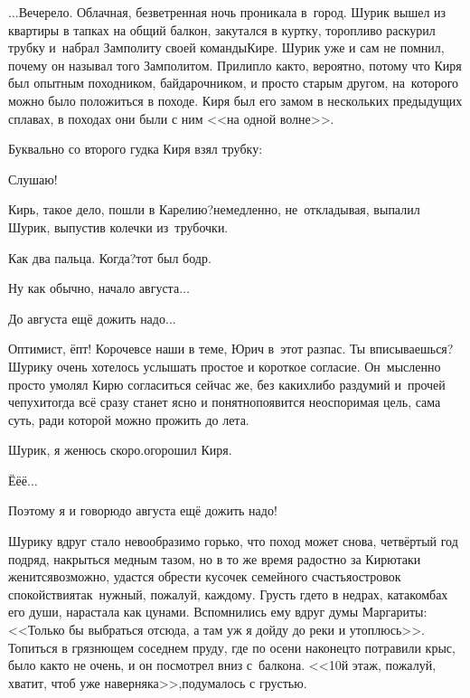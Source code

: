 {%
	
	$\ldots$Вечерело. Облачная, безветренная ночь проникала в~город.  Шурик вышел из квартиры в тапках на общий балкон, закутался в куртку, торопливо раскурил трубку и~набрал Замполиту своей команды\mdash Кире. Шурик уже и сам не помнил, почему он называл того Замполитом. Прилипло как\sdash то, вероятно, потому что Киря был опытным походником, байдарочником, и просто старым другом, на~которого можно было положиться в походе. Киря был его замом в нескольких предыдущих сплавах, в походах они были с ним <<на одной волне>>.

	Буквально со второго гудка Киря взял трубку:
	
	\diagdash Слушаю!
	
	\diagdash Кирь, такое дело, пошли в Карелию?\mdash немедленно, не~откладывая, выпалил Шурик, выпустив колечки из~трубочки.
	
	\diagdash Как два пальца. Когда?\mdash тот был бодр.
	
	\diagdash Ну как обычно, начало августа$\ldots$
	
	\diagdash До августа ещё дожить надо$\ldots$
	
	\diagdash Оптимист, ёпт! Короче\mdash все наши в теме, Юрич в~этот раз\mdash пас. Ты вписываешься?\mdash Шурику очень хотелось услышать простое и короткое согласие. Он~мысленно просто умолял Кирю согласиться сейчас же, без каких\sdash либо раздумий и~прочей чепухи\mdash тогда всё сразу станет ясно и понятно\mdash появится неоспоримая цель, сама суть, ради которой можно прожить до лета.
	
	\diagdash Шурик, я женюсь скоро.\mdash огорошил Киря.
	
	\diagdash Ё\sdash ё\sdash ё$\ldots$
	
	\diagdash Поэтому я и говорю\mdash до августа ещё дожить надо!
	
	Шурику вдруг стало невообразимо горько, что поход может снова, четвёртый год подряд, накрыться медным тазом, но в то же время радостно за Кирю\mdash таки женится\mdash возможно, удастся обрести кусочек семейного счастья\mdash островок спокойствия\mdash так~нужный, пожалуй, каждому. Грусть где\sdash то в недрах, катакомбах его души, нарастала как цунами. Вспомнились ему вдруг думы Маргариты: <<Только бы выбраться отсюда, а там уж я дойду до реки и утоплюсь>>\cite{МастерМаргарита}. Топиться в грязнющем соседнем пруду, где по осени наконец\sdash то потравили крыс, было как\sdash то не очень, и он посмотрел вниз с~балкона. <<10\sdash й этаж, пожалуй, хватит, чтоб уже наверняка>>,\mdash подумалось с грустью.
	
}
